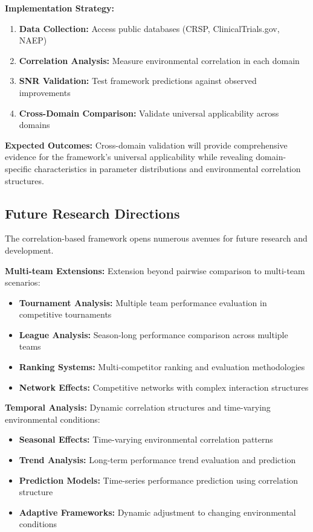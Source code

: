 \textbf{Implementation Strategy:}
\begin{enumerate}
    \item \textbf{Data Collection:} Access public databases (CRSP, ClinicalTrials.gov, NAEP)
    \item \textbf{Correlation Analysis:} Measure environmental correlation in each domain
    \item \textbf{SNR Validation:} Test framework predictions against observed improvements
    \item \textbf{Cross-Domain Comparison:} Validate universal applicability across domains
\end{enumerate}

\textbf{Expected Outcomes:}
Cross-domain validation will provide comprehensive evidence for the framework's universal applicability while revealing domain-specific characteristics in parameter distributions and environmental correlation structures.

\subsection{Future Research Directions}

The correlation-based framework opens numerous avenues for future research and development.

\textbf{Multi-team Extensions:}
Extension beyond pairwise comparison to multi-team scenarios:
\begin{itemize}
    \item \textbf{Tournament Analysis:} Multiple team performance evaluation in competitive tournaments
    \item \textbf{League Analysis:} Season-long performance comparison across multiple teams
    \item \textbf{Ranking Systems:} Multi-competitor ranking and evaluation methodologies
    \item \textbf{Network Effects:} Competitive networks with complex interaction structures
\end{itemize}

\textbf{Temporal Analysis:}
Dynamic correlation structures and time-varying environmental conditions:
\begin{itemize}
    \item \textbf{Seasonal Effects:} Time-varying environmental correlation patterns
    \item \textbf{Trend Analysis:} Long-term performance trend evaluation and prediction
    \item \textbf{Prediction Models:} Time-series performance prediction using correlation structure
    \item \textbf{Adaptive Frameworks:} Dynamic adjustment to changing environmental conditions
\end{itemize}

